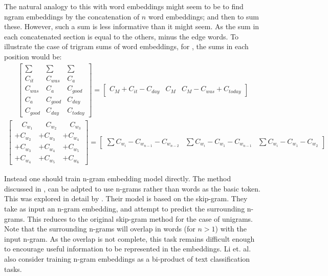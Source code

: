 \documentclass[12pt,parskip]{komatufte}
\begin{document}
The natural analogy to this with word embeddings might seem to be to find ngram embeddings by the concatenation of $n$ word embeddings; and then to sum these.
However, such a sum is less informative than it might seem.
As the sum in each concatenated section is equal to the others, minus the edge words. To illustrate the case of trigram sums of word embeddings, for ,
the sums in each position would be:
\begin{align}
\left[\begin{array}{c|c|c}
	\sum & \sum & \sum\\
	C_{it} & C_{was} & C_{a}\\
	C_{was} & C_{a} & C_{good}\\
	C_{a} & C_{good} & C_{day}\\
	C_{good} & C_{day} & C_{today}
\end{array}\right]=\left[\begin{array}{c|c|c}
	C_{M}+C_{it}-C_{day} & C_{M} & C_{M}-C_{was}+C_{today}\end{array}\right]
\end{align}
\begin{align}
\left[\begin{array}{c|c|c}
	\quad C_{w_{1}} & \quad C_{w_{2}} & \quad C_{w_{3}}\\
	+C_{w_{2}} & +C_{w_{3}} & +C_{w_{4}}\\
	+C_{w_{3}} & +C_{w_{4}} & +C_{w_{5}}\\
	+C_{w_{4}} & +C_{w_{5}} & +C_{w_{6}}
\end{array}\right]=\left[\begin{array}{c|c|c}
	\sum C_{w_{i}}-C_{w_{n-1}}-C_{w_{n-2}} & \sum C_{w_{i}}-C_{w_{1}}-C_{w_{n-1}} & \sum C_{w_{i}}-C_{w_{1}}-C_{w_{2}}\end{array}\right]
\end{align}


Instead one should train n-gram embedding model directly.
The method discussed in \label{sec:word-representations}, can be adpted to use n-grams rather than words as the basic token.
This was explored in detail by .
Their model is based on the skip-gram.
They take as input an n-gram embedding, and attempt to predict the surrounding n-grams.
This reduces to the original skip-gram method for the case of unigrams.
Note that the surrounding n-grams will overlap in words (for $n>1$)  with the input n-gram.
As the overlap is not complete, this task remains difficult enough to encourage useful information to be represented in the embeddings.
Li et. al. also consider training n-gram embeddings as a bi-product of text classification tasks.
\end{document}
